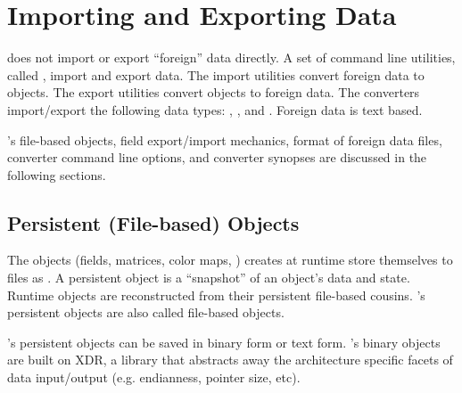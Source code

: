 %
%
%
%
%

\chapter{Importing and Exporting \sr{} Data}
\label{ch:import_export} 

\sr{} does not import or export ``foreign'' data directly. A set of
command line utilities, called , import and export
data.  The import utilities convert foreign data to \sr{}  
objects.  The export utilities convert \sr{} objects to
foreign data. The converters import/export the following \sr{} data
types: , , and .
Foreign data is text based.

\sr{}'s file-based objects, field export/import mechanics, format of
foreign data files, converter command line options, and converter
synopses are discussed in the following sections.


\section{\sr{} Persistent (File-based) Objects}
\label{sec:sr_file_object}

The objects (fields, matrices, color maps, \etc) \sr{} creates at runtime
store themselves to files as .  A persistent
object is a ``snapshot'' of an object's data and state.  Runtime
objects are reconstructed from their persistent file-based cousins.
\sr{}'s persistent objects are also called \sr{} file-based objects.

\sr{}'s persistent objects can be saved in binary form or text form.
\sr{}'s binary objects are built on XDR, a library that abstracts
away the architecture specific facets of data input/output (e.g.
endianness, pointer size, etc).

